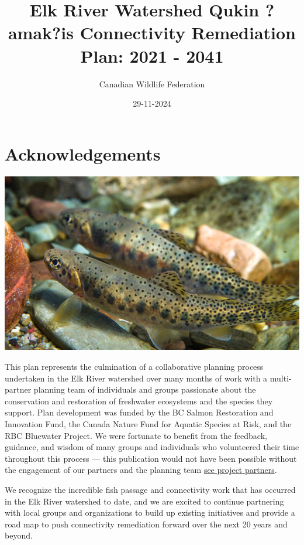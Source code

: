 \documentclass[
  letterpaper,
  DIV=11,
  numbers=noendperiod]{scrreprt}
\title{Elk River Watershed \textbar{} Qukin ?amak?is Connectivity
Remediation Plan: 2021 - 2041}
\author{Canadian Wildlife Federation}
\date{29-11-2024}
\renewcommand*\contentsname{Table of contents}
\newcommand\contentsname{Table of contents}
\begin{document}
\maketitle

\renewcommand*\contentsname{Table of contents}
{
\hypersetup{linkcolor=}
\setcounter{tocdepth}{1}
\tableofcontents
}


\chapter*{Acknowledgements}\label{acknowledgements}


\includegraphics{trout.png}

This plan represents the culmination of a collaborative planning process
undertaken in the Elk River watershed over many months of work with a
multi-partner planning team of individuals and groups passionate about
the conservation and restoration of freshwater ecosystems and the
species they support. Plan development was funded by the BC Salmon
Restoration and Innovation Fund, the Canada Nature Fund for Aquatic
Species at Risk, and the RBC Bluewater Project. We were fortunate to
benefit from the feedback, guidance, and wisdom of many groups and
individuals who volunteered their time throughout this process --- this
publication would not have been possible without the engagement of our
partners and the planning team \href{project-partners.qmd}{see project
partners}.

We recognize the incredible fish passage and connectivity work that has
occurred in the Elk River watershed to date, and we are excited to
continue partnering with local groups and organizations to build up
existing initiatives and provide a road map to push connectivity
remediation forward over the next 20 years and beyond.
\end{document}
